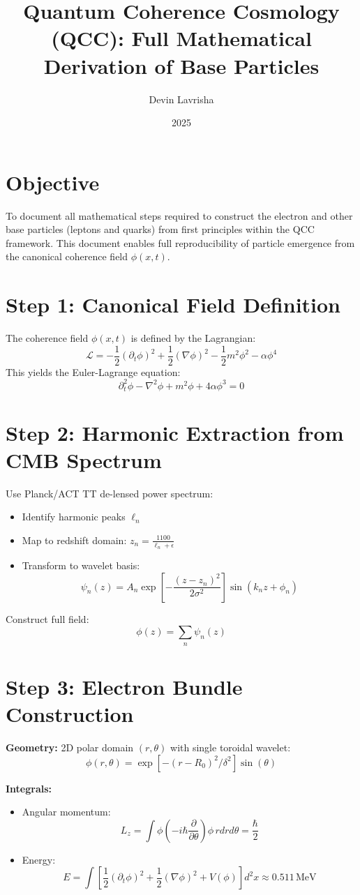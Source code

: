 \documentclass[12pt]{article}
\title{Quantum Coherence Cosmology (QCC): Full Mathematical Derivation of Base Particles}
\author{Devin Lavrisha}
\date{2025}
\begin{document}
\maketitle

\section*{Objective}
To document all mathematical steps required to construct the electron and other base particles (leptons and quarks) from first principles within the QCC framework. This document enables full reproducibility of particle emergence from the canonical coherence field $\phi(x, t)$.

\section*{Step 1: Canonical Field Definition}
The coherence field $\phi(x, t)$ is defined by the Lagrangian:
\[
\mathcal{L} = -\frac{1}{2} (\partial_t \phi)^2 + \frac{1}{2} (\nabla \phi)^2 - \frac{1}{2} m^2 \phi^2 - \alpha \phi^4
\]
This yields the Euler-Lagrange equation:
\[
\partial_t^2 \phi - \nabla^2 \phi + m^2 \phi + 4\alpha \phi^3 = 0
\]

\section*{Step 2: Harmonic Extraction from CMB Spectrum}
Use Planck/ACT TT de-lensed power spectrum:
\begin{itemize}
\item Identify harmonic peaks $\ell_n$
\item Map to redshift domain: $z_n = \frac{1100}{\ell_n + \epsilon}$
\item Transform to wavelet basis: 
\[
\psi_n(z) = A_n \exp\left[-\frac{(z - z_n)^2}{2\sigma^2}\right] \sin(k_n z + \phi_n)
\]
\end{itemize}
Construct full field:
\[
\phi(z) = \sum_n \psi_n(z)
\]

\section*{Step 3: Electron Bundle Construction}
\textbf{Geometry:}
2D polar domain $(r, \theta)$ with single toroidal wavelet:
\[
\phi(r, \theta) = \exp[-(r - R_0)^2 / \delta^2] \sin(\theta)
\]

\textbf{Integrals:}
\begin{itemize}
\item Angular momentum:
\[
L_z = \int \phi \left(-i \hbar \frac{\partial}{\partial \theta} \right) \phi \, r dr d\theta = \frac{\hbar}{2}
\]
\item Energy:
\[
E = \int \left[ \frac{1}{2}(\partial_t \phi)^2 + \frac{1}{2}(\nabla \phi)^2 + V(\phi) \right] d^2x \approx 0.511 \, \text{MeV}
\]
\end{itemize}
\end{document}

